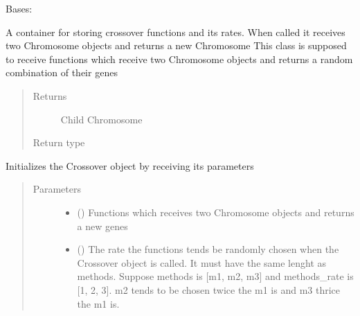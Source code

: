 \documentclass[letterpaper,10pt,english]{sphinxmanual}
\begin{document}
\begin{fulllineitems}
\label{\detokenize{genetic:genetic.Crossover}}
\sphinxAtStartPar
Bases: 

\sphinxAtStartPar
A container for storing crossover functions and its rates. When called it receives two Chromosome objects and
returns a new Chromosome
This class is supposed to receive functions which receive two Chromosome objects and returns a random combination of
their genes
\begin{quote}\begin{description}
\item[{Returns}] \leavevmode
\sphinxAtStartPar
Child Chromosome

\item[{Return type}] \leavevmode
\sphinxAtStartPar
{\hyperref[\detokenize{genetic:genetic.Chromosome}]{}}

\end{description}\end{quote}

\sphinxAtStartPar
Initializes the Crossover object by receiving its parameters
\begin{quote}\begin{description}
\item[{Parameters}] \leavevmode\begin{itemize}
\item {} 
\sphinxAtStartPar
{} (\sphinxstyleliteralemphasis{\sphinxupquote{{[}}}\sphinxstyleliteralemphasis{\sphinxupquote{{[}}}\sphinxstyleliteralemphasis{\sphinxupquote{{[}}}{\hyperref[\detokenize{genetic:genetic.Chromosome}]{\sphinxcrossref{\sphinxstyleliteralemphasis{\sphinxupquote{Chromosome}}}}}\sphinxstyleliteralemphasis{\sphinxupquote{{]}}}) \textendash{} Functions which receives two Chromosome objects and returns a new genes

\item {} 
\sphinxAtStartPar
{} (\sphinxstyleliteralemphasis{\sphinxupquote{{[}}}\sphinxstyleliteralemphasis{\sphinxupquote{{]}}}) \textendash{} The rate the functions tends be randomly chosen when the Crossover object is called. It
must have the same lenght as methods. Suppose methods is {[}m1, m2, m3{]} and methods\_rate is  {[}1, 2, 3{]}. m2
tends to be chosen twice the m1 is and m3 thrice the m1 is.


\end{itemize}
\end{description}
\end{quote}
\end{fulllineitems}
\end{document}

